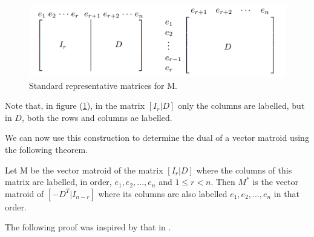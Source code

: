 \begin{figure}[H]
    \centering
    \includegraphics{SRF.png}
    \caption{Standard representative matrices for M. \cite{oxley1}}
    \label{StandertRepMat}
\end{figure}
Note that, in figure (\ref{StandertRepMat}), in the matrix $[I_r|D]$ only the columns are labelled, but in $D$, both the rows and columns ae labelled.

We can now use this construction to determine the dual of a vector matroid using the following theorem.

\begin{theorem}\label{DualRepMat}
    Let M be the vector matroid of the matrix $[I_r|D]$ where the columns of this matrix are labelled, in order, $e_1, e_2,...,e_n$ and $1\leq r< n$. Then $M^*$ is the vector matroid of $[-D^T|I_{n-r}]$ where its columns are also labelled $e_1, e_2,...,e_n$ in that order.
\end{theorem}

The following proof was inspired by that in \cite{oxley1}.

